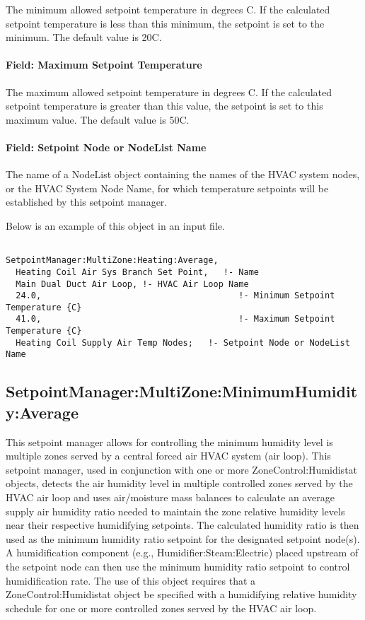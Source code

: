 The minimum allowed setpoint temperature in degrees C. If the calculated setpoint temperature is less than this minimum, the setpoint is set to the minimum. The default value is 20C.

\paragraph{Field: Maximum Setpoint Temperature}\label{field-maximum-setpoint-temperature-5}

The maximum allowed setpoint temperature in degrees C. If the calculated setpoint temperature is greater than this value, the setpoint is set to this maximum value. The default value is 50C.

\paragraph{Field: Setpoint Node or NodeList Name}\label{field-setpoint-node-or-nodelist-name-14}

The name of a NodeList object containing the names of the HVAC system nodes, or the HVAC System Node Name, for which temperature setpoints will be established by this setpoint manager.

Below is an example of this object in an input file.

\begin{lstlisting}

SetpointManager:MultiZone:Heating:Average,
  Heating Coil Air Sys Branch Set Point,   !- Name
  Main Dual Duct Air Loop, !- HVAC Air Loop Name
  24.0,                                       !- Minimum Setpoint Temperature {C}
  41.0,                                       !- Maximum Setpoint Temperature {C}
  Heating Coil Supply Air Temp Nodes;   !- Setpoint Node or NodeList Name
\end{lstlisting}

\subsection{SetpointManager:MultiZone:MinimumHumidity:Average}\label{setpointmanagermultizoneminimumhumidityaverage}

This setpoint manager allows for controlling the minimum humidity level is multiple zones served by a central forced air HVAC system (air loop). This setpoint manager, used in conjunction with one or more ZoneControl:Humidistat objects, detects the air humidity level in multiple controlled zones served by the HVAC air loop and uses air/moisture mass balances to calculate an average supply air humidity ratio needed to maintain the zone relative humidity levels near their respective humidifying setpoints. The calculated humidity ratio is then used as the minimum humidity ratio setpoint for the designated setpoint node(s). A humidification component (e.g., Humidifier:Steam:Electric) placed upstream of the setpoint node can then use the minimum humidity ratio setpoint to control humidification rate. The use of this object requires that a ZoneControl:Humidistat object be specified with a humidifying relative humidity schedule for one or more controlled zones served by the HVAC air loop.

